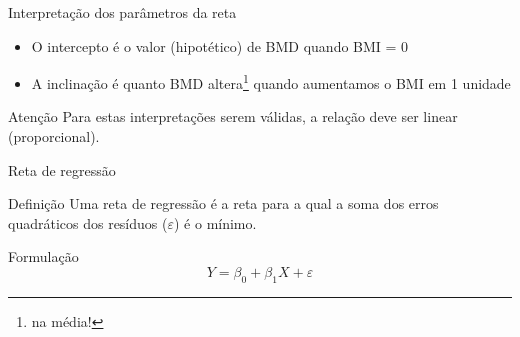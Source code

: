 \documentclass{beamer}
\begin{document}
\begin{frame}{Interpretação dos parâmetros da reta}
  \begin{itemize}
    \small
  \item O intercepto é o valor (hipotético) de BMD quando BMI = 0
  \item A inclinação é quanto BMD altera\footnote{na média!} quando aumentamos o BMI em 1 unidade
  \end{itemize}
  \vfill
  \begin{block}{Atenção}
    Para estas interpretações serem válidas, a relação deve ser linear (proporcional).
  \end{block}
\end{frame}

\begin{frame}{Reta de regressão}
  \begin{block}{Definição}
    \small Uma \alert{reta de regressão} é a reta para a qual a soma
    dos erros quadráticos dos resíduos ($\varepsilon$) é o mínimo.
  \end{block}
  \bigskip
  \vfill
  \begin{block}{Formulação}
    \footnotesize
    \begin{displaymath}
      Y = \beta_0 + \beta_1 X + \varepsilon
    \end{displaymath}
  \end{block}
\end{frame}
\end{document}
